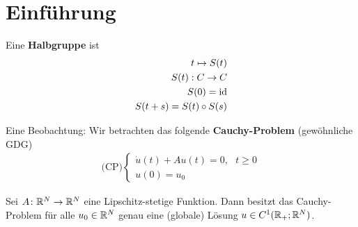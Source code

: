 
\setcounter{chapter}{-1}

\chapter{Einführung}
Eine \textbf{Halbgruppe} ist
\begin{align*}
	t\mapsto S(t)\\
	S(t):C\to C\\
	S(0)=\operatorname{id}\\
	S(t+s)=S(t)\circ S(s)
\end{align*}

Eine Beobachtung: Wir betrachten das folgende \textbf{Cauchy-Problem} (gewöhnliche GDG)
\begin{align}\label{CauchyProblem0}\tag{CP}
	(\text{CP)}\left\lbrace\begin{array}{cl}
		\dot{u}(t)+Au(t)=0,~~~t\geq0\\
		u(0) =u_0
	\end{array}\right.
\end{align}

\begin{theorem}\enter
	Sei $A\colon\mathbb{R}^N\to\mathbb{R}^N$ eine Lipschitz-stetige Funktion. 
	Dann besitzt das Cauchy-Problem für alle $u_0\in\mathbb{R}^N$ genau eine (globale) Lösung $u\in C^1(\mathbb{R}_+;\mathbb{R}^N)$.
\end{theorem}

